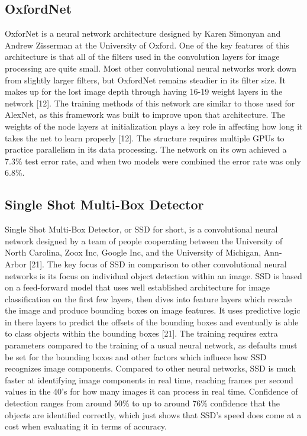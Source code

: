 \subsection{OxfordNet}
OxforNet is a neural network architecture designed by Karen Simonyan and Andrew Zisserman at the University of Oxford. 
One of the key features of this architecture is that all of the filters used in the convolution layers for image processing are quite small. 
Most other convolutional neural networks work down from slightly larger filters, but OxfordNet remains steadier in its filter size. 
It makes up for the lost image depth through having 16-19 weight layers in the network [12]. 
The training methods of this network are similar to those used for AlexNet, as this framework was built to improve upon that architecture. 
The weights of the node layers at initialization plays a key role in affecting how long it takes the net to learn properly [12]. 
The structure requires multiple GPUs to practice parallelism in its data processing. 
The network on its own achieved a 7.3\% test error rate, and when two models were combined the error rate was only 6.8\%.

\subsection{Single Shot Multi-Box Detector}
Single Shot Multi-Box Detector, or SSD for short, is a convolutional neural network designed by a team of people cooperating between the University of North Carolina, Zoox Inc, Google Inc, and the University of Michigan, Ann-Arbor [21]. 
The key focus of SSD in comparison to other convolutional neural networks is its focus on individual object detection within an image.
SSD is based on a feed-forward model that uses well established architecture for image classification on the first few layers, then dives into feature layers which rescale the image and produce bounding boxes on image features.
It uses predictive logic in there layers to predict the offsets of the bounding boxes and eventually is able to class objects within the bounding boxes [21].
The training requires extra parameters compared to the training of a usual neural network, as defaults must be set for the bounding boxes and other factors which influece how SSD recognizes image components.
Compared to other neural networks, SSD is much faster at identifying image components in real time, reaching frames per second values in the 40's for how many images it can process in real time. 
Confidence of detection ranges from around 50\% to up to around 76\% confidence that the objects are identified correctly, which just shows that SSD's speed does come at a cost when evaluating it in terms of accuracy.

